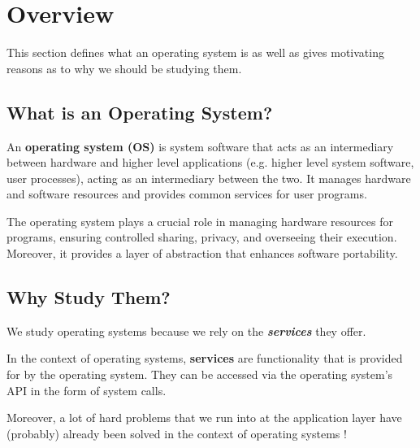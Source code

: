 \documentclass{report}
\begin{document}
\chapter{Overview}
This section defines what an operating system is as well as gives motivating reasons as to why we
should be studying them. 





\section{What is an Operating System?}
\begin{tcolorbox}[title=Definition: Operating System]
  An \textbf{operating system (OS)} is system software that acts as an intermediary between hardware and
  higher level applications (e.g. higher level system software, user processes), acting as an
  intermediary between the two. It manages hardware and software resources and provides common
  services for user programs. 
\end{tcolorbox}

\begin{tcolorbox}[colback=violet!5!white,colframe=violet,title=Abstraction: The Operating System] 
  The operating system plays a crucial role in managing hardware resources for programs, ensuring
  controlled sharing, privacy, and overseeing their execution. Moreover, it provides a layer of
  abstraction that enhances software portability. 
\end{tcolorbox}





\section{Why Study Them?}
We study operating systems because we rely on the \textit{\textbf{services}} they offer.

\begin{tcolorbox}[title=Definition: Services]
  In the context of operating systems, \textbf{services} are functionality that is provided
  for by the operating system. They can be accessed via the operating system's API in the form of
  system calls. 
\end{tcolorbox}

Moreover, a lot of hard problems that we run into at the application layer have (probably) already
been solved in the context of operating systems !
\end{document}
